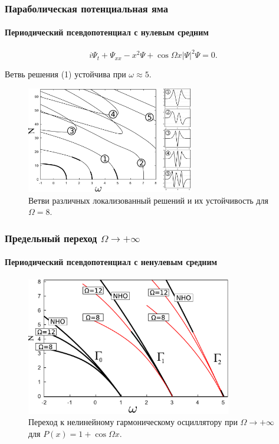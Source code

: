 \documentclass [10pt] {beamer}
\begin{document}
\begin{frame}
	\frametitle{Параболическая потенциальная яма}
	\framesubtitle{Периодический псевдопотенциал с нулевым средним}
	
	\begin{equation}
		i \Psi_t + \Psi_{xx} - x^2 \Psi + \cos \Omega x |\Psi|^2 \Psi = 0.
	\end{equation}

	Ветвь решения {\color{ceruleanblue} (1)} устойчива при $\omega \approx 5$.

	\begin{figure}
		\includegraphics[width=0.65\textwidth]{pic/solution_branches_zero_mean.pdf}
		\caption{Ветви различных локализованный решений и их устойчивость для $\Omega = 8$.}
		\label{pic:branches_zero_mean}
	\end{figure}	
	
\end{frame}

\begin{frame}
	\frametitle{Предельный переход $\Omega \to +\infty$}
	\framesubtitle{Периодический псевдопотенциал с ненулевым средним}
	
	\begin{figure}
		\includegraphics[width=0.8\textwidth]{pic/nonlinear_oscillator_limit.pdf}
		\caption{Переход к нелинейному гармоническому осциллятору при $\Omega \to +\infty$ для $P(x) = 1 + \cos \Omega x$.}
		\label{pic:nonlinear_limit}
	\end{figure}	
\end{frame}
\end{document}
